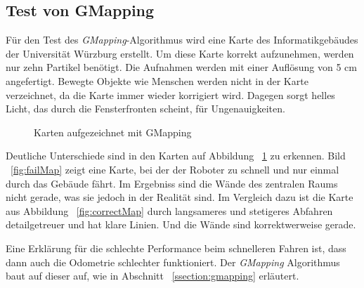 \documentclass[11pt,a4paper]{article}
\begin{document}
{\subsection{Test von GMapping}


{
	F\"ur den Test des \textit{GMapping}-Algorithmus wird eine Karte des Informatikgeb\"audes der Universit\"at W\"urzburg erstellt. Um diese Karte korrekt aufzunehmen, werden nur zehn Partikel ben\"otigt. Die Aufnahmen werden mit einer Aufl\"osung von 5 cm angefertigt. Bewegte Objekte wie Menschen werden nicht in der Karte verzeichnet, da die Karte immer wieder korrigiert wird. Dagegen sorgt helles Licht, das durch die Fensterfronten scheint, f\"ur  Ungenauigkeiten. 
	
	\begin{figure}[h]
		\centering
		\caption{Karten aufgezeichnet mit GMapping \label{fig:maps}}
	\end{figure}
	
	
	Deutliche Unterschiede sind in den Karten auf Abbildung ~\ref{fig:maps} zu erkennen. Bild ~\ref{fig:failMap} zeigt eine Karte, bei der der Roboter zu schnell und nur einmal durch das Geb\"aude f\"ahrt. Im Ergebniss sind die W\"ande des zentralen Raums nicht gerade, was sie jedoch in der Realit\"at sind. Im Vergleich dazu ist die Karte aus Abbildung ~\ref{fig:correctMap} durch langsameres und stetigeres Abfahren detailgetreuer und hat klare Linien. Und die W\"ande sind korrektwerweise gerade.
	
	
	Eine Erkl\"arung f\"ur die schlechte Performance beim schnelleren Fahren ist, dass dann auch die Odometrie schlechter funktioniert. Der \textit{GMapping} Algorithmus baut auf dieser auf, wie in Abschnitt ~\ref{ssection:gmapping} erl\"autert.
}




}
\end{document}
